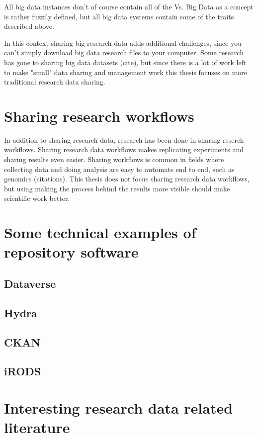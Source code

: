 All big data instances don't of course contain all of the Vs. Big Data as a
concept is rather fuzzily defined, but all big data systems contain some of the
traits described above.

In this context sharing big research data adds additional challenges, since 
you can't simply download big data research files to your computer. Some
research has gone to sharing big data datasets (cite), but since there is a lot
of work left to make "small" data sharing and management work this thesis
focuses on more traditional research data sharing.

\section{Sharing research workflows}

In addition to sharing research data, research has been done in sharing
reserch workflows. Sharing research data workflows makes replicating
experiments and sharing results even easier. Sharing workflows is common in
fields where collecting data and doing analysis are easy to automate end to
end, such as genomics (citations). This thesis does not focus sharing research
data workflows, but using making the process behind the results more visible
should make scientific work better.

\section{Some technical examples of repository software}

\subsection{Dataverse}

\subsection{Hydra}

\subsection{CKAN}

\subsection{iRODS}

\section{Interesting research data related literature}

